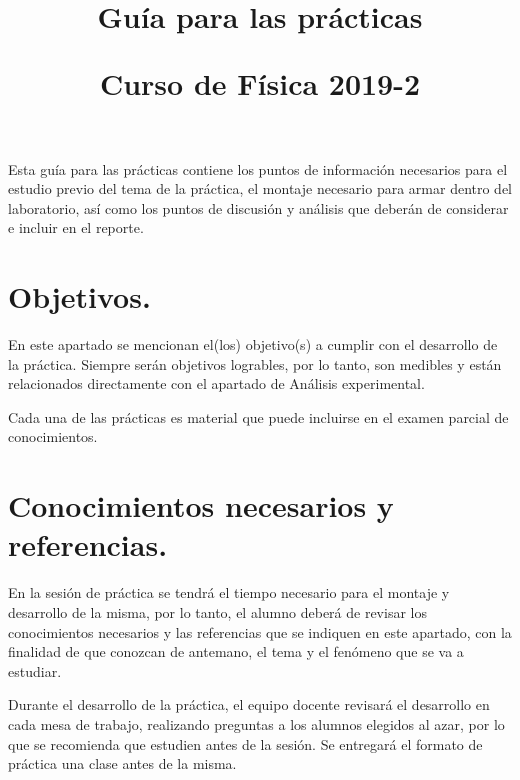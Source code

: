 
\usepackage[sfdefault]{roboto}  %
\usepackage[T1]{fontenc}
\title{Guía para las prácticas \\ \begin{Large}Curso de Física 2019-2\end{Large}}
\setlength{\voffset}{-1cm}

\maketitle
\vspace*{-2cm} 
\fontsize{14}{14}\selectfont
Esta guía para las prácticas contiene los puntos de información necesarios para el estudio previo del tema de la práctica, el montaje necesario para armar dentro del laboratorio, así como los puntos de discusión y análisis que deberán de considerar e incluir en el reporte.
\section{Objetivos.}
En este apartado se mencionan el(los) objetivo(s) a cumplir con el desarrollo de la práctica. Siempre serán objetivos logrables, por lo tanto, son medibles y están relacionados directamente con el apartado de Análisis experimental.
\par
Cada una de las prácticas es material que puede incluirse en el examen parcial de conocimientos.
\section{Conocimientos necesarios y referencias.}
En la sesión de práctica se tendrá el tiempo necesario para el montaje y desarrollo de la misma, por lo tanto, el alumno deberá de revisar los conocimientos necesarios y las referencias que se indiquen en este apartado, con la finalidad de que conozcan de antemano, el tema y el fenómeno que se va a estudiar.
\par
Durante el desarrollo de la práctica, el equipo docente revisará el desarrollo en cada mesa de trabajo, realizando preguntas a los alumnos elegidos al azar, por lo que se recomienda que estudien antes de la sesión. Se entregará el formato de práctica una clase antes de la misma.
